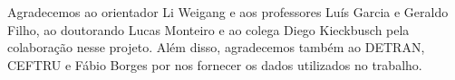 Agradecemos ao orientador Li Weigang e aos professores Luís Garcia e Geraldo Filho, ao doutorando Lucas Monteiro e ao colega Diego Kieckbusch pela colaboração nesse projeto. Além disso, agradecemos também ao DETRAN, CEFTRU e Fábio Borges por nos fornecer os dados utilizados no trabalho.